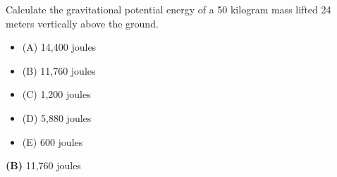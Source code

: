 

Calculate the gravitational potential energy of a 50 kilogram mass lifted 24 meters vertically above the ground.

\begin{itemize}
\item{(A)} 14,400 joules
\vskip 5pt 
\item{(B)} 11,760 joules
\vskip 5pt 
\item{(C)} 1,200 joules
\vskip 5pt 
\item{(D)} 5,880 joules
\vskip 5pt 
\item{(E)} 600 joules
\end{itemize}







{\bf (B)} 11,760 joules
 










